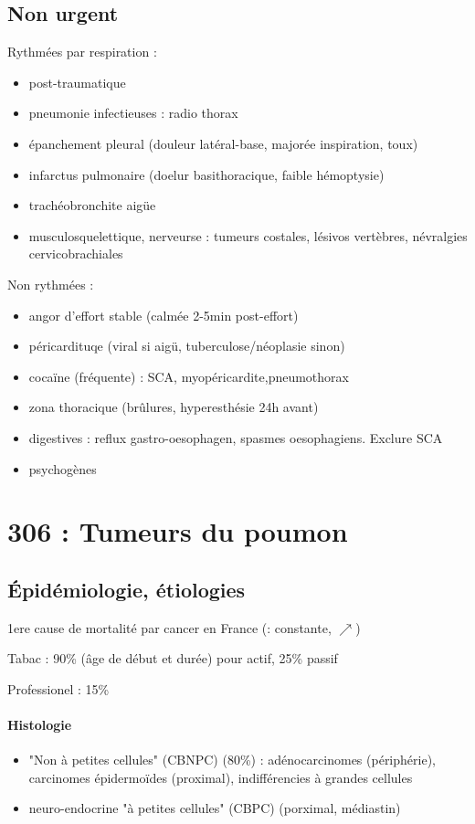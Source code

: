 \subsection{Non urgent}
Rythmées par respiration :
\begin{itemize}
  \item post-traumatique
  \item pneumonie infectieuses : radio thorax
  \item épanchement pleural (douleur latéral-base, majorée inspiration, toux)
  \item infarctus pulmonaire (doelur basithoracique, faible hémoptysie)
  \item trachéobronchite aigüe
  \item musculosquelettique, nerveurse : tumeurs costales, lésivos vertèbres,
    névralgies cervicobrachiales
\end{itemize}
Non rythmées :
\begin{itemize}
  \item angor d'effort stable (calmée 2-5min post-effort)
  \item péricardituqe (viral si aigü, tuberculose/néoplasie sinon)
  \item cocaïne (fréquente) : SCA, myopéricardite,pneumothorax
  \item zona thoracique (brûlures, hyperesthésie 24h avant)
  \item digestives : reflux gastro-oesophagen, spasmes oesophagiens. Exclure SCA
    \skull
  \item psychogènes
\end{itemize}

\section{306 : Tumeurs du poumon}%
\label{sec:306_tumeurs_du_poumon}

\subsection{Épidémiologie, étiologies}
1ere cause de mortalité par cancer en France (\male : constante, \female
$\nearrow$)

Tabac : 90\% (âge de début et durée) pour actif, 25\% passif

Professionel : 15\%

\paragraph{Histologie}
\begin{itemize}
  \item "Non à petites cellules" (CBNPC) (80\%) : adénocarcinomes (périphérie),
    carcinomes épidermoïdes (proximal), indifférencies à grandes cellules
  \item neuro-endocrine "à petites cellules" (CBPC) (porximal, médiastin)
\end{itemize}

